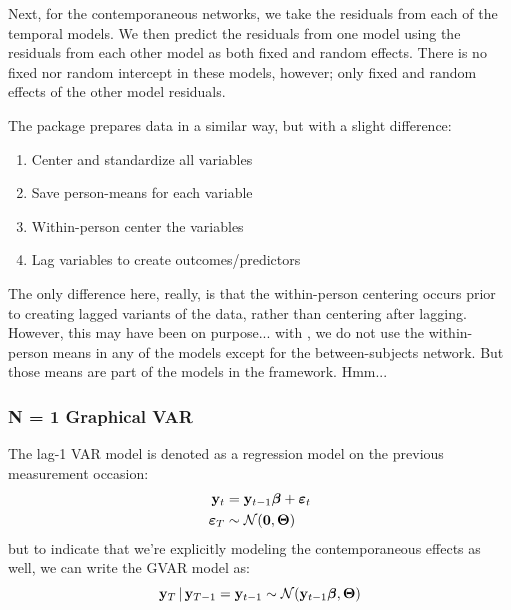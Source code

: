 Next, for the contemporaneous networks, we take the residuals from each of the temporal models. We then predict the residuals from one model using the residuals from each other model as both fixed and random effects. There is no fixed nor random intercept in these models, however; only fixed and random effects of the other model residuals. 

The  package prepares data in a similar way, but with a slight difference:
\begin{enumerate}
    \item Center and standardize all variables
    \item Save person-means for each variable
    \item Within-person center the variables
    \item Lag variables to create outcomes/predictors
\end{enumerate}
The only difference here, really, is that the within-person centering occurs prior to creating lagged variants of the data, rather than centering after lagging. However, this may have been on purpose... with , we do not use the within-person means in any of the models except for the between-subjects network. But those means are part of the models in the  framework. Hmm...

\subsubsection{N = 1 Graphical VAR}
The lag-1 VAR model is denoted as a regression model on the previous measurement occasion:
\begin{equation}
    \begin{split}
        \mathbf{y}_t &= \mathbf{y}_{t-1} \bm{\beta} + \bm{\varepsilon}_t \\
        \bm{\varepsilon}_T &\sim \mathcal{N}(\mathbf{0},\bm{\Theta})
    \end{split}
\end{equation}
but to indicate that we're explicitly modeling the contemporaneous effects as well, we can write the GVAR model as:
\begin{equation}
    \mathbf{y}_T\,|\,\mathbf{y}_{T-1} = \mathbf{y}_{t-1} \sim \mathcal{N}(\mathbf{y}_{t-1} \bm{\beta}, \bm{\Theta})
\end{equation}


